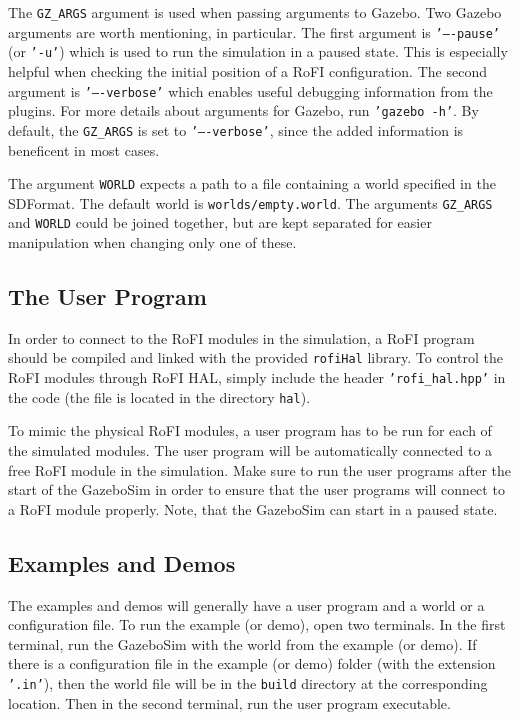 \documentclass[
  printed, %
  color,   %
  notable, %
  oneside, %
  nolof,   %
  nolot,   %
  nocover,
]{fithesis3}
\newcommand{\code}[1]{\texttt{#1}}
\begin{document}
The \code{GZ\_ARGS} argument is used when passing arguments to Gazebo.
Two Gazebo arguments are worth mentioning, in particular.
The first argument is \code{'----pause'} (or \code{'-u'}) which is used to run the simulation in a paused state.
This is especially helpful when checking the initial position of a RoFI configuration.
The second argument is \code{'----verbose'} which enables useful debugging information from the plugins.
For more details about arguments for Gazebo, run \code{'gazebo -h'}.
By default, the \code{GZ\_ARGS} is set to \code{'----verbose'}, since the added information is beneficent in most cases.

The argument \code{WORLD} expects a path to a file containing a world specified in the SDFormat.
The default world is \code{worlds/empty.world}.
The arguments \code{GZ\_ARGS} and \code{WORLD} could be joined together, but are kept separated for easier manipulation when changing only one of these.

\subsection{The User Program}

In order to connect to the RoFI modules in the simulation, a RoFI program should be compiled and linked with the provided \code{rofiHal} library.
To control the RoFI modules through RoFI HAL, simply include the header \code{'rofi\_hal.hpp'} in the code (the file is located in the directory \code{hal}).

To mimic the physical RoFI modules, a user program has to be run for each of the simulated modules.
The user program will be automatically connected to a free RoFI module in the simulation.
Make sure to run the user programs after the start of the GazeboSim in order to ensure that the user programs will connect to a RoFI module properly.
Note, that the GazeboSim can start in a paused state.

\subsection{Examples and Demos}

The examples and demos will generally have a user program and a world or a configuration file.
To run the example (or demo), open two terminals.
In the first terminal, run the GazeboSim with the world from the example (or demo).
If there is a configuration file in the example (or demo) folder (with the extension \code{'.in'}), then the world file will be in the \code{build} directory at the corresponding location.
Then in the second terminal, run the user program executable.
\end{document}
